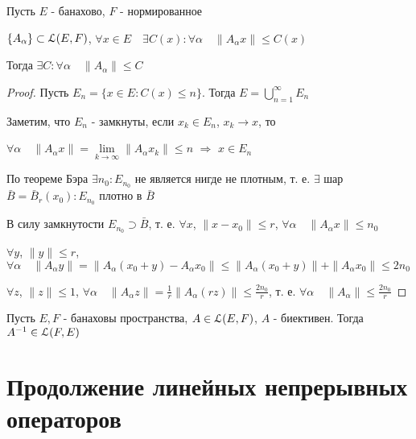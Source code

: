 \documentclass[a4paper,12pt]{report}
\begin{document}
\begin{thm} Пусть $E$ - банахово, $F$ - нормированное

$\{A_\alpha\}\subset\EuScript L(E,F)$, $\forall x\in E\quad\exists C(x)\colon\forall\alpha\quad\|A_\alpha x\|\le C(x)$

Тогда $\exists C\colon\forall\alpha\quad\|A_\alpha\|\le C$
\end{thm}
\begin{proof}
Пусть $E_n=\{x\in E\colon C(x)\le n\}$. Тогда $E=\bigcup\limits_{n=1}^\infty E_n$

Заметим, что $E_n$ - замкнуты, если $x_k\in E_n$, $x_k\to x$, то 

$\forall\alpha\quad\|A_\alpha x\|=\lim\limits_{k\to\infty}\|A_\alpha x_k\|\le n$ $\Rightarrow$ $x\in E_n$

По теореме Бэра $\exists n_0\colon E_{n_0}$ не является нигде не плотным, т. е. $\exists$ шар $\bar B=\bar B_r(x_0)\colon E_{n_0}$ плотно в $\bar B$

В силу замкнутости $E_{n_0}\supset \bar B$, т. е. $\forall x$, $\|x-x_0\|\le r$, $\forall\alpha\quad\|A_\alpha x\|\le n_0$

\noindent$\forall y$, $\|y\|\le r$, $\forall\alpha\quad\|A_\alpha y\|=\|A_\alpha(x_0+y)-A_\alpha x_0\|\le\|A_\alpha(x_0+y)\|+\|A_\alpha x_0\|\le2n_0$

\noindent$\forall z$, $\|z\|\le1$, $\forall\alpha\quad\|A_\alpha z\|=\displaystyle\frac1r\|A_\alpha(rz)\|\le\displaystyle\frac{2n_0}{r}$, т. е. $\forall\alpha\quad\|A_\alpha\|\le\displaystyle\frac{2n_0}{r}$
\end{proof}
 


\begin{thm} Пусть $E,F$ - банаховы пространства, $A\in\EuScript L(E,F)$, $A$ - биективен. Тогда $A^{-1}\in\EuScript L(F,E)$
\end{thm}






\chapter{Продолжение линейных непрерывных операторов}
\end{document}
